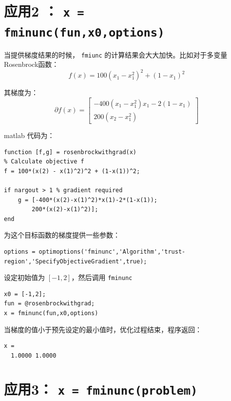 \documentclass[10pt,a4paper,UTF8]{article}
\begin{document}
\section{应用2 ： \texttt{x = fminunc(fun,x0,options)}}
\label{sec:org8d3f3ec}


当提供梯度结果的时候， \texttt{fmiunc} 的计算结果会大大加快。比如对于多变量Rosenbrock函数：
\begin{equation}
\label{eq:2}
f(x) = 100(x_{1} - x_{1}^{2})^{2} + (1-x_{1})^{2}
\end{equation}

其梯度为：
\begin{equation}
\label{eq:3}
\partial f(x) =
\begin{bmatrix}
-400(x_{1} - x_{1}^{2})x_{1} - 2(1-x_{1}) \\
200(x_{2} - x_{1}^{2})
\end{bmatrix}
\end{equation}

matlab 代码为：
\lstset{language=matlab,label= ,caption= ,captionpos=b,numbers=none}
\begin{lstlisting}
function [f,g] = rosenbrockwithgrad(x)
% Calculate objective f
f = 100*(x(2) - x(1)^2)^2 + (1-x(1))^2;

if nargout > 1 % gradient required
    g = [-400*(x(2)-x(1)^2)*x(1)-2*(1-x(1));
        200*(x(2)-x(1)^2)];
end
\end{lstlisting}

为这个目标函数的梯度提供一些参数：
\lstset{language=matlab,label= ,caption= ,captionpos=b,numbers=none}
\begin{lstlisting}
options = optimoptions('fminunc','Algorithm','trust-region','SpecifyObjectiveGradient',true);
\end{lstlisting}

设定初始值为 \([-1,2]\)，然后调用 \texttt{fminunc}
\lstset{language=matlab,label= ,caption= ,captionpos=b,numbers=none}
\begin{lstlisting}
x0 = [-1,2];
fun = @rosenbrockwithgrad;
x = fminunc(fun,x0,options)
\end{lstlisting}
当梯度的值小于预先设定的最小值时，优化过程结束，程序返回：
\lstset{language=matlab,label= ,caption= ,captionpos=b,numbers=none}
\begin{lstlisting}
x =
  1.0000 1.0000
\end{lstlisting}
\section{应用3： \texttt{x = fminunc(problem)}}
\label{sec:org0fc90b3}
\end{document}

